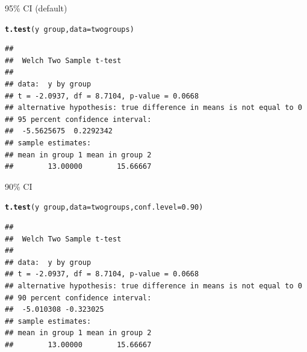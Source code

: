 \documentclass[unknownkeysallowed]{beamer}\usepackage[]{graphicx}\usepackage[]{color}
\makeatletter
\newcommand{\hlnum}[1]{\textcolor[rgb]{0.686,0.059,0.569}{#1}}%
\newcommand{\hlopt}[1]{\textcolor[rgb]{0,0,0}{#1}}%
\newcommand{\hlstd}[1]{\textcolor[rgb]{0.345,0.345,0.345}{#1}}%
\newcommand{\hlkwc}[1]{\textcolor[rgb]{0.333,0.667,0.333}{#1}}%
\newcommand{\hlkwd}[1]{\textcolor[rgb]{0.737,0.353,0.396}{\textbf{#1}}}%
\newenvironment{kframe}{%
 \def\at@end@of@kframe{}%
 \ifinner\ifhmode%
  \def\at@end@of@kframe{\end{minipage}}%
  \begin{minipage}{\columnwidth}%
 \fi\fi%
 \def\FrameCommand##1{\hskip\@totalleftmargin \hskip-\fboxsep
 \colorbox{shadecolor}{##1}\hskip-\fboxsep
     \hskip-\linewidth \hskip-\@totalleftmargin \hskip\columnwidth}%
 \MakeFramed {\advance\hsize-\width
   \@totalleftmargin\z@ \linewidth\hsize
   \@setminipage}}%
 {\par\unskip\endMakeFramed%
 \at@end@of@kframe}
\newenvironment{knitrout}{}{} %
\makeatother
\begin{document}
\begin{frame}[fragile]{95\% CI (default)}

  

\begin{knitrout}
\color{fgcolor}\begin{kframe}
\begin{alltt}
\hlkwd{t.test}\hlstd{(y}\hlopt{~}\hlstd{group,}\hlkwc{data}\hlstd{=twogroups)}
\end{alltt}
\begin{verbatim}
## 
## 	Welch Two Sample t-test
## 
## data:  y by group
## t = -2.0937, df = 8.7104, p-value = 0.0668
## alternative hypothesis: true difference in means is not equal to 0
## 95 percent confidence interval:
##  -5.5625675  0.2292342
## sample estimates:
## mean in group 1 mean in group 2 
##        13.00000        15.66667
\end{verbatim}
\end{kframe}
\end{knitrout}
  
  
\end{frame}

\begin{frame}[fragile]{90\% CI}

\begin{knitrout}
\color{fgcolor}\begin{kframe}
\begin{alltt}
  \hlkwd{t.test}\hlstd{(y}\hlopt{~}\hlstd{group,}\hlkwc{data}\hlstd{=twogroups,}\hlkwc{conf.level}\hlstd{=}\hlnum{0.90}\hlstd{)}
\end{alltt}
\begin{verbatim}
## 
## 	Welch Two Sample t-test
## 
## data:  y by group
## t = -2.0937, df = 8.7104, p-value = 0.0668
## alternative hypothesis: true difference in means is not equal to 0
## 90 percent confidence interval:
##  -5.010308 -0.323025
## sample estimates:
## mean in group 1 mean in group 2 
##        13.00000        15.66667
\end{verbatim}
\end{kframe}
\end{knitrout}
  
\end{frame}
\end{document}
